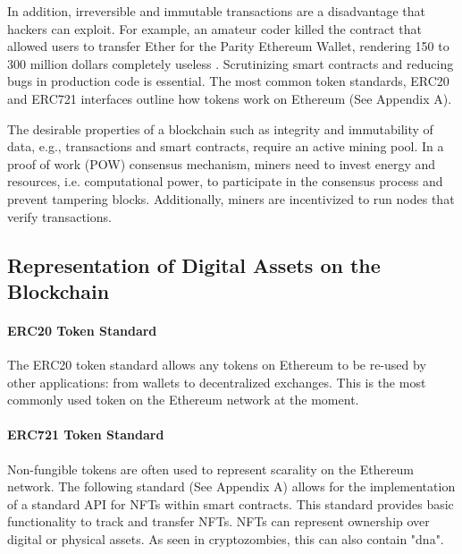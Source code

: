 \documentclass[12pt,tightenlines,letterpaper]{scrartcl}
\begin{document}
		In addition, irreversible and immutable transactions are a disadvantage that hackers can exploit. For example, an amateur coder killed the contract that allowed users to transfer Ether for the Parity \gls{Ethereum} Wallet, rendering 150 to 300 million dollars completely useless \cite{funnyJoke:Online}. Scrutinizing smart contracts and reducing bugs in production code is essential. The most common token standards, ERC20 and ERC721 interfaces outline how tokens work on Ethereum (See Appendix A).%
		
		The desirable properties of a \gls{blockchain} such as integrity and immutability of data, e.g., transactions and
		smart contracts, require an active mining pool. In a proof of work (POW) consensus  mechanism,  miners need to invest energy and resources,
		i.e. computational power, to participate in the consensus process and prevent tampering blocks. Additionally, miners are incentivized to run nodes that verify transactions. %
	
\subsection{Representation of Digital Assets on the Blockchain}

\paragraph{ERC20 Token Standard}

The ERC20 token standard allows any tokens on Ethereum to be re-used by other applications: from wallets to decentralized exchanges. This is the most commonly used token on the Ethereum network at the moment.

\paragraph{ERC721 Token Standard}

Non-fungible tokens are often used to represent scarality on the \gls{Ethereum} network.
The following standard (See Appendix A) allows for the implementation of a standard API for NFTs within smart contracts. This standard provides basic functionality to track and transfer NFTs.
NFTs can represent ownership over digital or physical assets. As seen in cryptozombies, this can also contain "dna".
\end{document}
